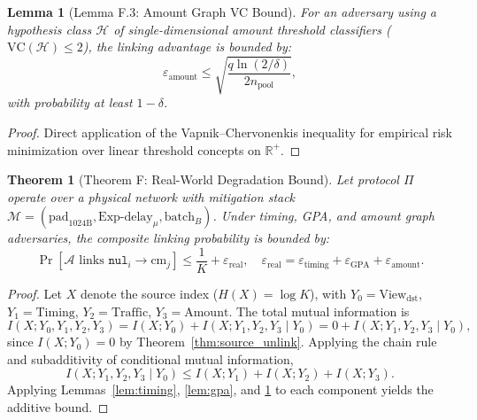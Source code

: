 \documentclass[sigconf,nonacm]{acmart}
\newtheorem{theorem}{Theorem}
\newtheorem{lemma}{Lemma}
\begin{document}
\begin{lemma}[Lemma F.3: Amount Graph VC Bound]\label{lem:amount}
For an adversary using a hypothesis class $\mathcal{H}$ of single-dimensional amount threshold classifiers ($\text{VC}(\mathcal{H}) \le 2$), the linking advantage is bounded by:
\begin{equation}
\varepsilon_{\text{amount}} \le \sqrt{\frac{q \ln(2/\delta)}{2 n_{\text{pool}}}},
\end{equation}
with probability at least $1 - \delta$.
\end{lemma}

\begin{proof}
Direct application of the Vapnik--Chervonenkis inequality for empirical risk minimization over linear threshold concepts on $\mathbb{R}^+$.
\end{proof}

\begin{theorem}[Theorem F: Real-World Degradation Bound]\label{thm:degradation}
Let protocol $\Pi$ operate over a physical network with mitigation stack $\mathcal{M} = (\text{pad}_{1024\text{B}}, \text{Exp-delay}_\mu, \text{batch}_B)$. Under timing, GPA, and amount graph adversaries, the composite linking probability is bounded by:
\begin{equation}
\Pr[\mathcal{A} \text{ links } \mathtt{nul}_i \to \text{cm}_j] \le \frac{1}{K} + \varepsilon_{\text{real}}, \quad \varepsilon_{\text{real}} = \varepsilon_{\text{timing}} + \varepsilon_{\text{GPA}} + \varepsilon_{\text{amount}}.
\end{equation}
\end{theorem}

\begin{proof}
Let $X$ denote the source index ($H(X) = \log K$), with $Y_0 = \text{View}_{\text{dst}}$, $Y_1 = \text{Timing}$, $Y_2 = \text{Traffic}$, $Y_3 = \text{Amount}$. The total mutual information is
\begin{equation}
I(X; Y_0, Y_1, Y_2, Y_3) = I(X; Y_0) + I(X; Y_1, Y_2, Y_3 \mid Y_0) = 0 + I(X; Y_1, Y_2, Y_3 \mid Y_0),
\end{equation}
since $I(X; Y_0) = 0$ by Theorem~\ref{thm:source_unlink}. Applying the chain rule and subadditivity of conditional mutual information,
\begin{equation}
I(X; Y_1, Y_2, Y_3 \mid Y_0) \le I(X; Y_1) + I(X; Y_2) + I(X; Y_3).
\end{equation}
Applying Lemmas~\ref{lem:timing}, \ref{lem:gpa}, and \ref{lem:amount} to each component yields the additive bound.
\end{proof}
\end{document}
